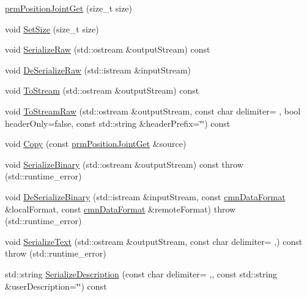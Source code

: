 \begin{DoxyCompactItemize}
\item 
\hyperlink{classprm_position_joint_get_a46958e4ad191dd0ea6734eddadea1468}{prm\+Position\+Joint\+Get} (size\+\_\+t size)
\item 
void \hyperlink{classprm_position_joint_get_a9a01d226c12a990de5e5d47b1b27b598}{Set\+Size} (size\+\_\+t size)
\item 
void \hyperlink{classprm_position_joint_get_a9064acf739897886317e7af36e98ce67}{Serialize\+Raw} (std\+::ostream \&output\+Stream) const 
\item 
void \hyperlink{classprm_position_joint_get_ae88c1c98bd875063f3d3a624359e3fe9}{De\+Serialize\+Raw} (std\+::istream \&input\+Stream)
\item 
void \hyperlink{classprm_position_joint_get_ae3abdf51680f23b094c15be562b46620}{To\+Stream} (std\+::ostream \&output\+Stream) const 
\item 
void \hyperlink{classprm_position_joint_get_af86770522846be112b6472118d73865b}{To\+Stream\+Raw} (std\+::ostream \&output\+Stream, const char delimiter= \textquotesingle{} \textquotesingle{}, bool header\+Only=false, const std\+::string \&header\+Prefix=\char`\"{}\char`\"{}) const 
\item 
void \hyperlink{classprm_position_joint_get_aefbf8c9f16ee488e4fc1bff21f698ced}{Copy} (const \hyperlink{classprm_position_joint_get}{prm\+Position\+Joint\+Get} \&source)
\item 
void \hyperlink{classprm_position_joint_get_a827d9b3a5033c6c097bfa4d4c9f8f851}{Serialize\+Binary} (std\+::ostream \&output\+Stream) const   throw (std\+::runtime\+\_\+error)
\item 
void \hyperlink{classprm_position_joint_get_a13b6ae6cdc1d6c5044b6848118f0a0b4}{De\+Serialize\+Binary} (std\+::istream \&input\+Stream, const \hyperlink{classcmn_data_format}{cmn\+Data\+Format} \&local\+Format, const \hyperlink{classcmn_data_format}{cmn\+Data\+Format} \&remote\+Format)  throw (std\+::runtime\+\_\+error)
\item 
void \hyperlink{classprm_position_joint_get_adac2e3e3ab3a5bff049f132935bf822f}{Serialize\+Text} (std\+::ostream \&output\+Stream, const char delimiter= \textquotesingle{},\textquotesingle{}) const   throw (std\+::runtime\+\_\+error)
\item 
std\+::string \hyperlink{classprm_position_joint_get_a3dc5f435eefa591d48d4c3038f2ca0ec}{Serialize\+Description} (const char delimiter= \textquotesingle{},\textquotesingle{}, const std\+::string \&user\+Description=\char`\"{}\char`\"{}) const 
\item 

\end{DoxyCompactItemize}
